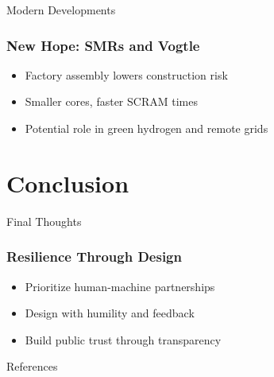 \documentclass{beamer}
\begin{document}
\begin{frame}{Modern Developments}
  \subsubsection*{New Hope: SMRs and Vogtle}
  \begin{itemize}
    \item Factory assembly lowers construction risk
    \item Smaller cores, faster SCRAM times
    \item Potential role in green hydrogen and remote grids
  \end{itemize}
\end{frame}

\section{Conclusion}

\begin{frame}{Final Thoughts}
  \subsubsection*{Resilience Through Design}
  \begin{itemize}
    \item Prioritize human-machine partnerships
    \item Design with humility and feedback
    \item Build public trust through transparency
  \end{itemize}
\end{frame}

\begin{frame}{References}
  \nocite{*}
  \printbibliography
\end{frame}
\end{document}
